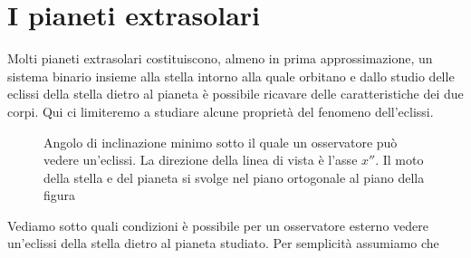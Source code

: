 \section{I pianeti extrasolari}
\label{sec:extrasolari}

Molti pianeti extrasolari costituiscono, almeno in prima approssimazione, un
sistema binario insieme alla stella intorno alla quale orbitano e dallo studio
delle eclissi della stella dietro al pianeta è possibile ricavare delle
caratteristiche dei due corpi. Qui ci limiteremo a studiare alcune proprietà del
fenomeno dell'eclissi.

\begin{figure}
  \centering
  \caption[Angolo di inclinazione minimo sotto il quale un osservatore può
  vedere
  un'eclissi]{Angolo di inclinazione minimo sotto il quale un osservatore può
    vedere un'eclissi. La direzione della linea di vista è l'asse $x''$. Il moto
    della stella e del pianeta si svolge nel piano ortogonale al piano della
    figura}
  \label{fig:minimo-angolo-eclissi}
\end{figure}
Vediamo sotto quali condizioni è possibile per un osservatore esterno vedere
un'eclissi della stella dietro al pianeta studiato. Per semplicità assumiamo che
